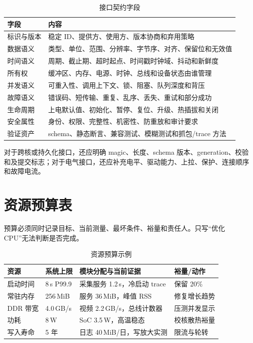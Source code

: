 \begin{table}[htbp]
  \centering
  \caption{接口契约字段}
  \begin{tabular}{p{30mm}p{110mm}}
    \hline
    字段 & 内容 \\
    \hline
    标识与版本 & 稳定 ID、提供方、使用方、版本协商和弃用策略 \\
    数据语义 & 类型、单位、范围、分辨率、字节序、对齐、保留位和无效值 \\
    时间语义 & 周期、截止期、超时起点、时间戳时钟域、抖动和新鲜度 \\
    所有权 & 缓冲区、内存、电源、时钟、总线和设备状态由谁管理 \\
    并发语义 & 可重入性、调用上下文、锁、阻塞、队列深度和背压 \\
    故障语义 & 错误码、短传输、重复、乱序、丢失、重试和部分成功 \\
    生命周期 & 上电默认值、初始化、暂停、复位、升级、热插拔和关闭 \\
    安全属性 & 身份、权限、完整性、机密性、防重放和审计要求 \\
    验证资产 & schema、静态断言、兼容测试、模糊测试和抓包/trace 方法 \\
    \hline
  \end{tabular}
\end{table}

对于跨核或持久化接口，还应明确 magic、长度、schema 版本、generation、校验和及提交标志；对于电气接口，还应补充电平、驱动能力、上拉、保护、连接顺序和故障电流。

\section{资源预算表}

预算必须同时记录目标、当前测量、最坏条件、裕量和责任人。只写“优化 CPU”无法判断是否完成。

\begin{table}[htbp]
  \centering
  \caption{资源预算示例}
  \begin{tabular}{p{24mm}p{25mm}p{40mm}p{38mm}}
    \hline
    资源 & 系统上限 & 模块分配与当前证据 & 裕量/动作 \\
    \hline
    启动时间 & 8\,s P99.9 & 采集服务 1.2\,s，冷启动 trace & 保留 20\% \\
    常驻内存 & 256\,MiB & 服务 36\,MiB，峰值 RSS & 修复增长趋势 \\
    DDR 带宽 & 4.0\,GB/s & 视频 2.2\,GB/s，总线计数器 & 压测并发显示 \\
    功耗 & 8\,W & SoC 3.5\,W，高温稳态 & 校核散热裕量 \\
    写入寿命 & 5 年 & 日志 40\,MiB/日，写放大实测 & 限流与轮转 \\
    \hline
  \end{tabular}
\end{table}

